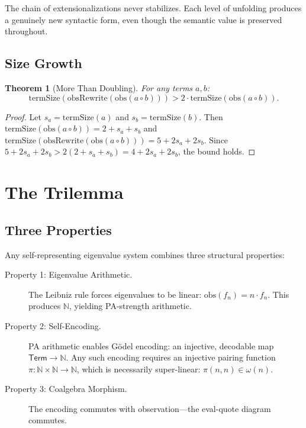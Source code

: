 \documentclass[11pt,a4paper]{article}
\newtheorem{theorem}{Theorem}[section]
\theoremstyle{definition}
\theoremstyle{remark}
\newcommand{\compose}{\mathbin{\circ}}
\newcommand{\obs}{\mathrm{obs}}
\newcommand{\fn}{f_n}
\newcommand{\Term}{\mathsf{Term}}
\newcommand{\obsRewrite}{\mathrm{obsRewrite}}
\newcommand{\termSize}{\mathrm{termSize}}
\newcommand{\smul}[2]{#1 \cdot #2}
\newcommand{\N}{\mathbb{N}}
\begin{document}
The chain of extensionalizations never stabilizes. Each level of unfolding
produces a genuinely new syntactic form, even though the semantic value is
preserved throughout.

\subsection{Size Growth}

\begin{theorem}[More Than Doubling]
\label{thm:size-growth}
For any terms $a, b$:
\[
  \termSize(\obsRewrite(\obs(a \compose b)))
  > 2 \cdot \termSize(\obs(a \compose b)).
\]
\end{theorem}

\begin{proof}
Let $s_a = \termSize(a)$ and $s_b = \termSize(b)$. Then
$\termSize(\obs(a \compose b)) = 2 + s_a + s_b$ and
$\termSize(\obsRewrite(\obs(a \compose b))) = 5 + 2s_a + 2s_b$.
Since $5 + 2s_a + 2s_b > 2(2 + s_a + s_b) = 4 + 2s_a + 2s_b$, the bound
holds.
\end{proof}

\section{The Trilemma}
\label{sec:trilemma}

\subsection{Three Properties}

Any self-representing eigenvalue system combines three structural properties:

\begin{description}
  \item[Property 1: Eigenvalue Arithmetic.] The Leibniz rule forces
    eigenvalues to be linear: $\obs(\fn) = \smul{n}{\fn}$. This produces
    $\N$, yielding PA-strength arithmetic.
  \item[Property 2: Self-Encoding.] PA arithmetic enables G\"odel encoding:
    an injective, decodable map $\Term \to \N$. Any such encoding requires
    an injective pairing function
    $\pi : \N \times \N \to \N$, which is necessarily super-linear:
    $\pi(n,n) \in \omega(n)$.
  \item[Property 3: Coalgebra Morphism.] The encoding commutes with
    observation---the eval-quote diagram commutes.
\end{description}
\end{document}
